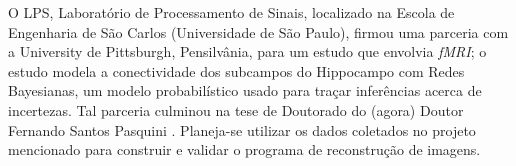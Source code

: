 \documentclass[11pt,a4paper]{report}
\begin{document}
O LPS, Laboratório de Processamento de Sinais, localizado na Escola de Engenharia de São Carlos (Universidade de São Paulo), firmou uma parceria com a University de Pittsburgh, Pensilvânia, para um estudo que envolvia \emph{fMRI}; o estudo modela a conectividade dos subcampos do Hippocampo com Redes Bayesianas, um modelo probabilístico usado para traçar inferências acerca de incertezas. Tal parceria culminou na tese de Doutorado do (agora) Doutor Fernando Santos Pasquini \cite{Santos2017}. Planeja-se utilizar os dados coletados no projeto mencionado para construir e validar o programa de reconstrução de imagens.
\begin{table}[ht]
  \centering
  \caption{Cronograma do Projeto}
  \label{tab:1}
\end{table}
\end{document}
